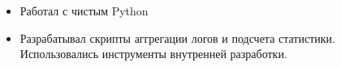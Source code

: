 \begin{itemize}
	\item Работал с чистым Python
    \item Разрабатывал скрипты аггрегации логов и подсчета статистики. Использовались инструменты внутренней разработки.
\end{itemize}

